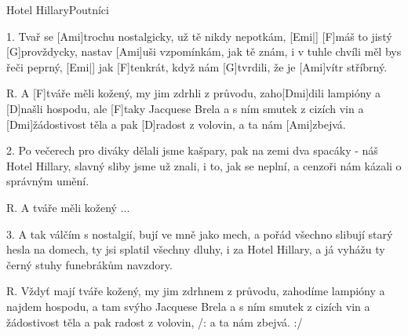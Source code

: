 \begin{song}{Hotel Hillary}{Poutníci}

\begin{xverse}{1. }
Tvař se [Ami]trochu nostalgicky, už tě nikdy nepotkám, [Emi|]{}
[F]máš to jistý [G]provždycky, nastav [Ami]uši vzpomínkám,
jak tě znám, i v tuhle chvíli měl bys řeči peprný, [Emi|]{}
jak [F]tenkrát, když nám [G]tvrdili, že je [Ami]vítr stříbrný.
\end{xverse}

\begin{xverse}{R. }
A [F]tváře měli kožený, my jim zdrhli z průvodu,
zaho[Dmi]dili lampióny a [D]našli hospodu,
ale [F]taky Jacquese Brela a s ním smutek z cizích vin
a [Dmi]{žádo}stivost těla a pak [D]radost z volovin,
a ta nám [Ami]zbejvá.
\end{xverse}

\begin{xverse}{2. }
Po večerech pro diváky dělali jsme kašpary,
pak na zemi dva spacáky - náš Hotel Hillary,
slavný sliby jsme už znali, i to, jak se neplní,
a cenzoři nám kázali o správným umění.
\end{xverse}


\begin{xverse}{R. }
A tváře měli kožený ...
\end{xverse}


\begin{xverse}{3. }
A tak válčím s nostalgií, bují ve mně jako mech,
a pořád všechno slibují starý hesla na domech,
ty jsi splatil všechny dluhy, i za Hotel Hillary,
a já vyhážu ty černý stuhy funebrákům navzdory.
\end{xverse}


\begin{xverse}{R. }
Vždyť mají tváře kožený, my jim zdrhnem z průvodu,
zahodíme lampióny a najdem hospodu,
a tam svýho Jacquese Brela a s ním smutek z cizích vin
a žádostivost těla a pak radost z volovin,
/: a ta nám zbejvá. :/
\end{xverse}
\end{song}

